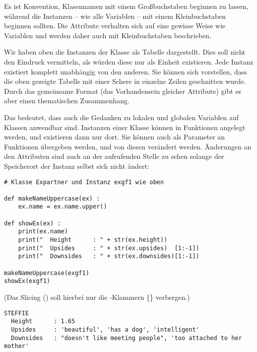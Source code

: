 \begin{hintbox}
Es ist Konvention, Klasennamen mit einem Großbuchstaben beginnen zu lassen, während die Instanzen -- wie alle Variablen -- mit einem Kleinbuchstaben beginnen sollten. Die Attribute verhalten sich auf eine gewisse Weise wie Variablen und werden daher auch mit Kleinbuchstaben beschrieben.
\end{hintbox}

Wir haben oben die Instanzen der Klasse  als Tabelle dargestellt. Dies soll nicht den Eindruck vermitteln, als würden diese nur als Einheit existieren. Jede Instanz existiert komplett unabhängig von den anderen. Sie können sich vorstellen, dass die oben gezeigte Tabelle mit einer Schere in einzelne Zeilen geschnitten wurde. Durch das gemeinsame Format (\ie das Vorhandensein gleicher Attribute) gibt es aber einen thematischen Zusammenhang.

Das bedeutet, dass auch die Gedanken zu lokalen und globalen Variablen auf Klassen anwendbar sind. Instanzen einer Klasse können in Funktionen angelegt werden, und existieren dann nur dort. Sie können auch als Parameter an Funktionen übergeben werden, und von diesen verändert werden. Änderungen an den Attributen sind auch an der aufrufenden Stelle zu sehen solange der Speicherort der Instanz selbst sich nicht ändert:

\begin{codebox}
\begin{verbatim}
# Klasse Expartner und Instanz exgf1 wie oben

def makeNameUppercase(ex) :
    ex.name = ex.name.upper()

def showEx(ex) :
    print(ex.name)
    print("  Height      : " + str(ex.height))
    print("  Upsides     : " + str(ex.upsides)  [1:-1])
    print("  Downsides   : " + str(ex.downsides)[1:-1])

makeNameUppercase(exgf1)
showEx(exgf1)
\end{verbatim}
\end{codebox}
(Das Slicing (\inPy{[1:-1]}) soll hierbei nur die -Klammern \{\} verbergen.)
\begin{cmdbox}
\begin{verbatim}
STEFFIE
  Height      : 1.65
  Upsides     : 'beautiful', 'has a dog', 'intelligent'
  Downsides   : "doesn't like meeting people", 'too attached to her mother'
\end{verbatim}
\end{cmdbox}

